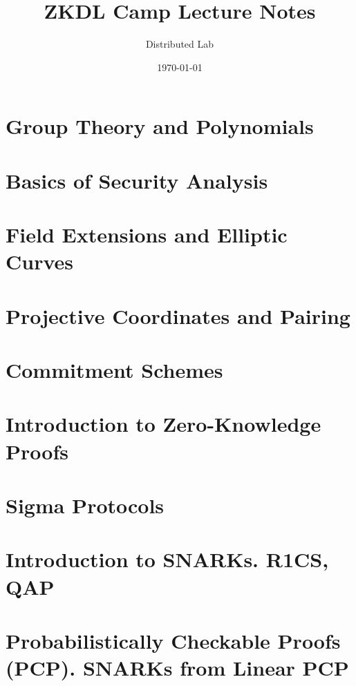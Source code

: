 \documentclass{zkdl-template}
\title{\huge\sffamily\bfseries ZKDL Camp Lecture Notes}
\author{\Large\sffamily Distributed Lab}
\date{\sffamily \today}
\begin{document}
\pagestyle{fancy}

\maketitle

\pagebreak

\tableofcontents

\pagebreak

\section{Group Theory and Polynomials}



\section{Basics of Security Analysis}\label{section:math-crypto-2}



\section{Field Extensions and Elliptic Curves}



\section{Projective Coordinates and Pairing}



\section{Commitment Schemes}



\section{Introduction to Zero-Knowledge Proofs}



\section{Sigma Protocols}



\section{Introduction to SNARKs. R1CS, QAP}



\section{Probabilistically Checkable Proofs (PCP). SNARKs from Linear PCP}


\end{document}
